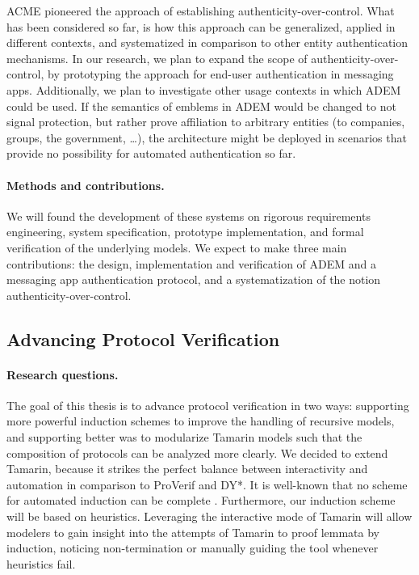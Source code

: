 \documentclass{article}
\begin{document}
\Gls{ACME} pioneered the approach of establishing authenticity-over-control.
What has been considered so far, is how this approach can be generalized, applied in different contexts, and systematized in comparison to other entity authentication mechanisms.
In our research, we plan to expand the scope of authenticity-over-control, by prototyping the approach for end-user authentication in messaging apps.
Additionally, we plan to investigate other usage contexts in which \gls{ADEM} could be used.
If the semantics of emblems in \gls{ADEM} would be changed to not signal protection, but rather prove affiliation to arbitrary entities (to companies, groups, the government, \dots), the architecture might be deployed in scenarios that provide no possibility for automated authentication so far.

\paragraph{Methods and contributions.}
We will found the development of these systems on rigorous requirements engineering, system specification, prototype implementation, and formal verification of the underlying models.
We expect to make three main contributions: the design, implementation and verification of \gls{ADEM} and a messaging app authentication protocol, and a systematization of the notion authenticity-over-control.

\subsection{Advancing Protocol Verification}

\paragraph{Research questions.}
The goal of this thesis is to advance protocol verification in two ways: supporting more powerful induction schemes to improve the handling of recursive models, and supporting better was to modularize Tamarin models such that the composition of protocols can be analyzed more clearly.
We decided to extend Tamarin, because it strikes the perfect balance between interactivity and automation in comparison to ProVerif and DY*.
It is well-known that no scheme for automated induction can be complete \cite{InductionBundy}.
Furthermore, our induction scheme will be based on heuristics.
Leveraging the interactive mode of Tamarin will allow modelers to gain insight into the attempts of Tamarin to proof lemmata by induction, noticing non-termination or manually guiding the tool whenever heuristics fail.
\end{document}
